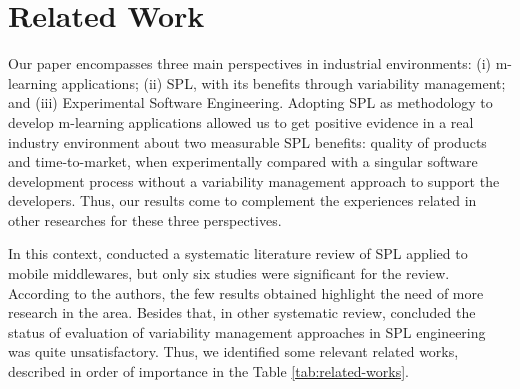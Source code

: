 

\section{Related Work} \label{section5}

Our paper encompasses three main perspectives in industrial environments: (i) m-learning applications; (ii) SPL, with its benefits through variability management; and (iii) Experimental Software Engineering. Adopting SPL as methodology to develop m-learning applications allowed us to get positive evidence in a real industry environment about two measurable SPL benefits: quality of products and time-to-market, when experimentally compared with a singular software development process without a variability management approach to support the developers. Thus, our results come to complement the experiences related in other researches for these three perspectives.

In this context, \cite{bezerra09} conducted a systematic literature review of SPL applied to mobile middlewares, but only six studies were significant for the review. According to the authors, the few results obtained highlight the need of more research in the area. Besides that, \cite{chen11} in other systematic review, concluded the status of evaluation of variability management approaches in SPL engineering was quite unsatisfactory. Thus, we identified some relevant related works, described in order of importance in the Table \ref{tab:related-works}.

